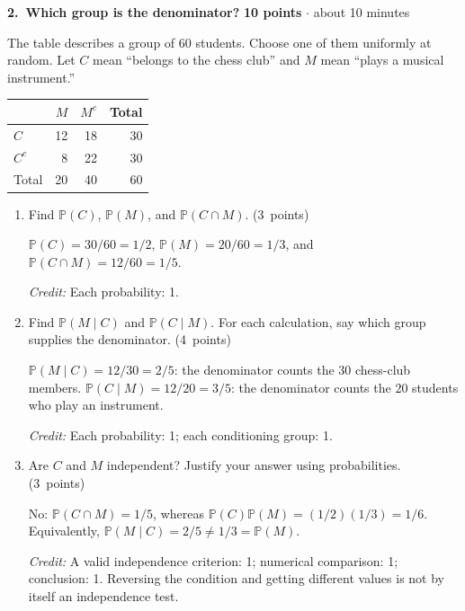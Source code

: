 \documentclass[11pt,letterpaper]{article}
\newcommand{\Prob}{\mathbb P}
\newcommand{\partpts}[1]{\unskip\nobreak\hspace{.3em}%
  \mbox{\small\color{muted}(#1 points)}}
\newcommand{\credit}[1]{\par{\footnotesize\color{muted}\textit{Credit:} #1}}
\newcommand{\problem}[4]{\par\addvspace{8pt}%
  {\large\bfseries\color{indigo}#1.\ #2}\hfill
  {\small\color{muted}\textbf{#3 points} $\cdot$ about #4 minutes}\par\nobreak}
\begin{document}
\problem{2}{Which group is the denominator?}{10}{10}
The table describes a group of 60 students. Choose one of them uniformly at
random. Let $C$ mean ``belongs to the chess club'' and $M$ mean ``plays a
musical instrument.''
\begin{center}
\begin{tabular}{@{}lrrr@{}}
\toprule
 & $M$ & $M^c$ & Total\\
\midrule
$C$   & 12 & 18 & 30\\
$C^c$ &  8 & 22 & 30\\
\midrule
Total & 20 & 40 & 60\\
\bottomrule
\end{tabular}
\end{center}
\begin{enumerate}
  \item Find $\Prob(C)$, $\Prob(M)$, and $\Prob(C\cap M)$. \partpts{3}
  \begin{solution}[.4in]
    $\Prob(C)=30/60=1/2$, $\Prob(M)=20/60=1/3$, and
    $\Prob(C\cap M)=12/60=1/5$.
    \credit{Each probability: 1.}
  \end{solution}

  \item Find $\Prob(M\mid C)$ and $\Prob(C\mid M)$.
  For each calculation, say which group supplies the denominator. \partpts{4}
  \begin{solution}[.65in]
    $\Prob(M\mid C)=12/30=2/5$: the denominator counts the 30 chess-club
    members. $\Prob(C\mid M)=12/20=3/5$: the denominator counts the 20
    students who play an instrument.
    \credit{Each probability: 1; each conditioning group: 1.}
  \end{solution}

  \item Are $C$ and $M$ independent? Justify your answer using probabilities.
  \partpts{3}
  \begin{solution}[.6in]
    No: $\Prob(C\cap M)=1/5$, whereas
    $\Prob(C)\Prob(M)=(1/2)(1/3)=1/6$.
    Equivalently, $\Prob(M\mid C)=2/5\ne1/3=\Prob(M)$.
    \credit{A valid independence criterion: 1; numerical comparison: 1;
    conclusion: 1. Reversing the condition and getting different values
    is not by itself an independence test.}
  \end{solution}
\end{enumerate}
\end{document}
